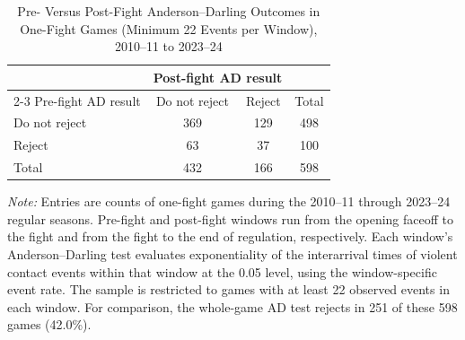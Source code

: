 \begin{table}[htbp]
\centering
\caption{Pre- Versus Post-Fight Anderson--Darling Outcomes in One-Fight Games (Minimum 22 Events per Window), 2010--11 to 2023--24}
\label{tab:one_fight_AD_rejection_min_22_20102011_20232024}
\small
\renewcommand{\arraystretch}{1.15}
\setlength{\tabcolsep}{6pt}

\begin{tabular*}{0.78\textwidth}{@{\extracolsep{\fill}}lccc}
\toprule
 & \multicolumn{2}{c}{Post-fight AD result} & \\
\cmidrule(lr){2-3}
Pre-fight AD result & Do not reject & Reject & Total \\
\midrule
Do not reject & 369 & 129 & 498 \\
Reject & 63 & 37 & 100 \\
\midrule
Total & 432 & 166 & 598 \\
\bottomrule
\end{tabular*}

\vspace{0.4em}
\parbox{0.78\textwidth}{
\footnotesize
\textit{Note:} Entries are counts of one-fight games during the 2010--11 through 2023--24 regular seasons. Pre-fight and post-fight windows run from the opening faceoff to the fight and from the fight to the end of regulation, respectively. Each window's Anderson--Darling test evaluates exponentiality of the interarrival times of violent contact events within that window at the 0.05 level, using the window-specific event rate. The sample is restricted to games with at least 22 observed events in each window. For comparison, the whole-game AD test rejects in 251 of these 598 games (42.0\%).
}
\end{table}
